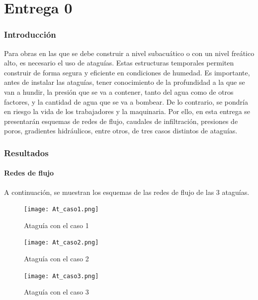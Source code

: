 \documentclass{article}
\begin{document}
\part{Entrega 0}
\section{Introducción}
Para obras en las que se debe construir a nivel subacuático o con un nivel freático alto, es necesario el uso de ataguías. Estas estructuras temporales permiten construir de forma segura y eficiente en condiciones de humedad. Es importante, antes de instalar las ataguías, tener conocimiento de la profundidad a la que se van a hundir, la presión que se va a contener, tanto del agua como de otros factores, y la cantidad de agua que se va a bombear. De lo contrario, se pondría en riesgo la vida de los trabajadores y la maquinaria. Por ello, en esta entrega se presentarán esquemas de redes de flujo, caudales de infiltración, presiones de poros, gradientes hidráulicos, entre otros, de tres casos distintos de ataguías.

\newpage

\section{Resultados}
\subsection{Redes de flujo}
A continuación, se muestran los esquemas de las redes de flujo de las 3 ataguías. 

\begin{figure}[h]
    \centering
    \begin{minipage}{0.32\textwidth}
        \centering
        \texttt{[image: At\_caso1.png]}
        \caption{Ataguía con el caso 1}
    \end{minipage}
    \hfill
    \begin{minipage}{0.32\textwidth}
        \centering
        \texttt{[image: At\_caso2.png]}
        \caption{Ataguía con el caso 2}
    \end{minipage}
    \hfill
    \begin{minipage}{0.32\textwidth}
        \centering
        \texttt{[image: At\_caso3.png]}
        \caption{Ataguía con el caso 3}
    \end{minipage}
\end{figure}
\end{document}
